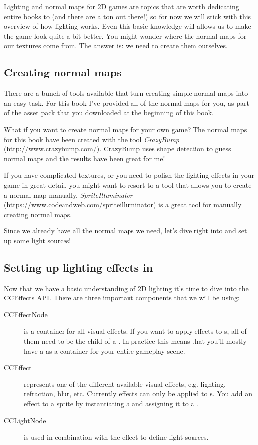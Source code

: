 Lighting and normal maps for 2D games are topics that are worth dedicating
entire books to (and there are a ton out there!) so for now we will stick with
this overview of how lighting works. Even this basic knowledge will allows us to
make the game look quite a bit better. You might wonder where the normal maps
for our textures come from. The answer is: we need to create them ourselves. 

\subsection{Creating normal maps}
There are a bunch of tools available that turn creating simple normal maps into
an easy task. For this book I've provided all of the normal maps for you, as
part of the asset pack that you downloaded at the beginning of this book.

What if you want to create normal maps for your own game? The normal maps for
this book have been created with the tool \textit{CrazyBump}
(\url{http://www.crazybump.com/}). CrazyBump uses shape detection to guess
normal maps and the results have been great for me!

If you have complicated textures, or you need to polish the lighting effects in
your game in great detail, you might want to resort to a tool that allows you to
create a normal map manually. \textit{SpriteIlluminator}
(\url{https://www.codeandweb.com/spriteilluminator}) is a great tool for
manually creating normal maps.

Since we already have all the normal maps we need, let's dive right into \SB{}
and set up some light sources!

\subsection{Setting up lighting effects in \SB{}}
Now that we have a basic understanding of 2D lighting it's time to dive into the
CCEffects API. There are three important components that we will be using:
\begin{description}
\item[CCEffectNode] is a container for all visual effects. If
you want to apply effects to \ccsprite{}s, all of them need to be the child of a
. In practice this means that you'll mostly have a
 as a container for your entire gameplay scene.
\item[CCEffect] represents one of the different available visual effects, e.g.
lighting, refraction, blur, etc. Currently effects can only be applied to
\ccsprite{}s. You add an effect to a sprite by instantiating a
 and assigning it to a \ccsprite{}.
\item[CCLightNode] is used in combination with the effect
 to define light sources.
\end{description}

